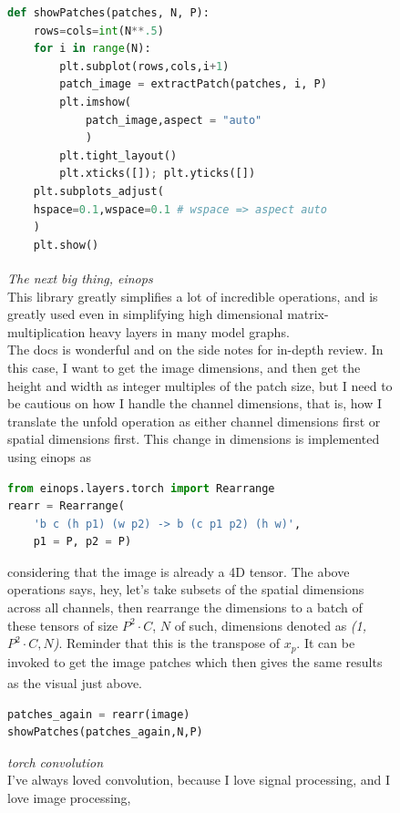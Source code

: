 \documentclass[12pt]{article}
\newcommand{\customtext}[3]{%
    \vspace{#2} %
    \fontsize{13}{8}\textcolor{#1}{\textit{#3}}%
}
\newcommand{\sidecite}[1]{\textsuperscript{\textcolor{blue}{\textbf{\scriptsize#1}}}}
\newcommand{\customtitle}[1]{\fontsize{14}{8}\textcolor{xtitle}{\textit{#1}}\\}
\newcommand{\maincitecount}{\sidecite{\stepcounter{maincite}\themaincite}}
\begin{document}
\begin{figure}[!htb]
\begin{minipage}[t]{.4\textwidth}
\begin{lstlisting}[language=python,style=python,basicstyle=\ttfamily\tiny]
def showPatches(patches, N, P):
    rows=cols=int(N**.5)
    for i in range(N):
        plt.subplot(rows,cols,i+1)
        patch_image = extractPatch(patches, i, P)
        plt.imshow(
            patch_image,aspect = "auto"
            )
        plt.tight_layout()
        plt.xticks([]); plt.yticks([])
    plt.subplots_adjust(
    hspace=0.1,wspace=0.1 # wspace => aspect auto
    )
    plt.show()
\end{lstlisting}
\end{minipage}
\end{figure}
\pagebreak
\begin{figure}[!htb]
\begin{minipage}[t]{0.65\textwidth}
\customtext{xtitle}{0em}{The next big thing, einops\maincitecount}\\
This library greatly simplifies a lot of incredible operations, and is 
greatly used even in simplifying high dimensional matrix-multiplication 
heavy layers in many model graphs.\\
The docs is wonderful and on the side notes for in-depth review. 
In this case, I want to get the image dimensions, and then get the 
height and width as integer multiples of the patch size, but I need to 
be cautious on how I handle the channel dimensions, that is, how I translate 
the unfold operation as either channel dimensions first or spatial dimensions
first.
    This change in dimensions is implemented using einops as     
\begin{lstlisting}[language=python,style=python,basicstyle=\ttfamily\footnotesize]
from einops.layers.torch import Rearrange
rearr = Rearrange(
    'b c (h p1) (w p2) -> b (c p1 p2) (h w)', 
    p1 = P, p2 = P)
\end{lstlisting}
considering that the image is already a {4D} tensor. The above operations says,
hey, let's take subsets of the spatial dimensions across all channels, then 
rearrange the dimensions to a batch of these tensors of size {\small$P^2\cdot C$},
$N$ of such, dimensions denoted as {\it (1,$P^2\cdot C,N$)}. 
Reminder that this is the transpose of $x_p$. It can be invoked to get the image 
patches which then gives the same results as the visual just above.\maincitecount
\begin{lstlisting}[language=python,style=python,basicstyle=\ttfamily\footnotesize]
patches_again = rearr(image)
showPatches(patches_again,N,P)
\end{lstlisting}
\customtitle{torch convolution}
I've always loved convolution, because I love signal processing, and I love image processing,

\end{minipage}
\end{figure}
\end{document}

